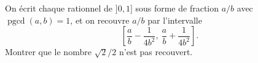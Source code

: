 On écrit chaque rationnel de $]0, 1]$ sous forme de fraction $a/b$ avec $\operatorname{pgcd}(a, b) = 1$, et on recouvre $a/b$ par l'intervalle
\[ \left[\frac{a}{b} - \frac{1}{4b^2},\ \frac{a}{b} + \frac{1}{4b^2}\right]. \]
Montrer que le nombre $\sqrt{2}/2$ n'est pas recouvert.
